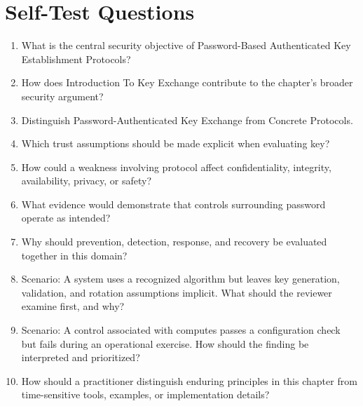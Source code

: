 \documentclass[11pt]{article}
\begin{document}
\section*{Self-Test Questions}
\begin{enumerate}
\item What is the central security objective of Password-Based Authenticated Key Establishment Protocols?
\item How does Introduction To Key Exchange contribute to the chapter's broader security argument?
\item Distinguish Password-Authenticated Key Exchange from Concrete Protocols.
\item Which trust assumptions should be made explicit when evaluating key?
\item How could a weakness involving protocol affect confidentiality, integrity, availability, privacy, or safety?
\item What evidence would demonstrate that controls surrounding password operate as intended?
\item Why should prevention, detection, response, and recovery be evaluated together in this domain?
\item Scenario: A system uses a recognized algorithm but leaves key generation, validation, and rotation assumptions implicit. What should the reviewer examine first, and why?
\item Scenario: A control associated with computes passes a configuration check but fails during an operational exercise. How should the finding be interpreted and prioritized?
\item How should a practitioner distinguish enduring principles in this chapter from time-sensitive tools, examples, or implementation details?
\end{enumerate}
\end{document}
